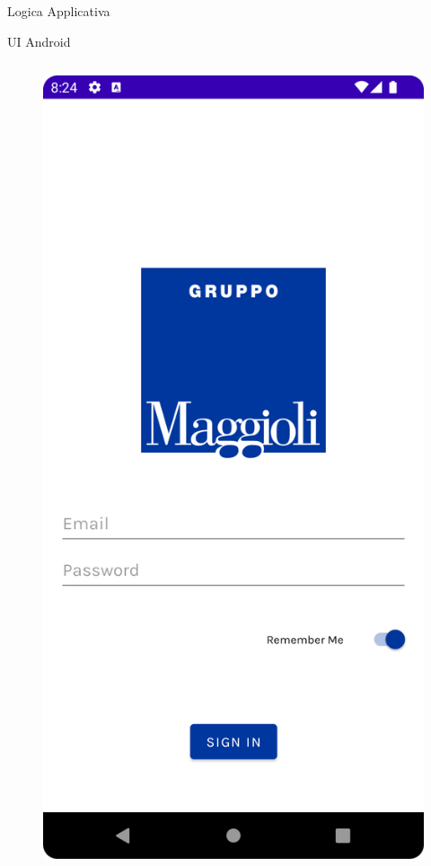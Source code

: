 \begin{frame}{Logica Applicativa}
    
\end{frame}

\begin{frame}{UI Android}
    \begin{columns}[onlytextwidth]
        \begin{column}{0.24\textwidth}
        
            \begin{figure}[H]
                \includegraphics[width=1\textwidth]{img/login.png}
            \end{figure}
            

\end{column}
\end{columns}
\end{frame}
